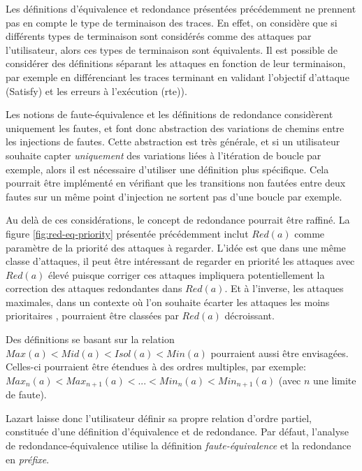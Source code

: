                 Les définitions d'équivalence et redondance présentées précédemment ne prennent pas en compte le type de terminaison des traces.
                En effet, on considère que si différents types de terminaison sont considérés comme des attaques par l'utilisateur, alors ces types de terminaison sont équivalents.
                Il est possible de considérer des définitions séparant les attaques en fonction de leur terminaison, par exemple en différenciant les traces terminant en validant l'objectif d'attaque (Satisfy) et les erreurs à l'exécution (\gls{rte})).
                
                Les notions de faute-équivalence et les définitions de redondance considèrent uniquement les fautes, et font donc abstraction des variations de chemins entre les injections de fautes.
                Cette abstraction est très générale, et si un utilisateur souhaite capter \textit{uniquement} des variations liées à l'itération de boucle par exemple, alors il est nécessaire d'utiliser une définition plus spécifique.
                Cela pourrait être implémenté en vérifiant que les transitions non fautées entre deux fautes sur un même point d'injection ne sortent pas d'une boucle par exemple.
                
                Au delà de ces considérations, le concept de redondance pourrait être raffiné. La figure \ref{fig:red-eq-priority} présentée précédemment inclut $Red(a)$ comme paramètre de la priorité des attaques à regarder.
                L'idée est que dans une même classe d'attaques, il peut être intéressant de regarder en priorité les attaques avec $Red(a)$ élevé puisque corriger ces attaques impliquera potentiellement la correction des attaques redondantes dans $Red(a)$.
                Et à l'inverse, les attaques maximales, dans un contexte où l'on souhaite écarter les attaques les moins \og prioritaires \fg{}, pourraient être classées par $Red(a)$ décroissant.
                
                Des définitions se basant sur la relation $Max(a) < Mid(a) < Isol(a) < Min(a)$ pourraient aussi être envisagées.
                Celles-ci pourraient être étendues à des ordres multiples, par exemple: $Max_{n}(a) < Max_{n+1}(a) < ... < Min_n(a) <  Min_{n+1}(a)$ (avec $n$ une limite de faute).
                
                Lazart laisse donc l'utilisateur définir sa propre relation d'ordre partiel, constituée d'une définition d'équivalence et de redondance.
                Par défaut, l'analyse de redondance-équivalence utilise la définition \textit{faute-équivalence} et la redondance en \textit{préfixe}.
          
